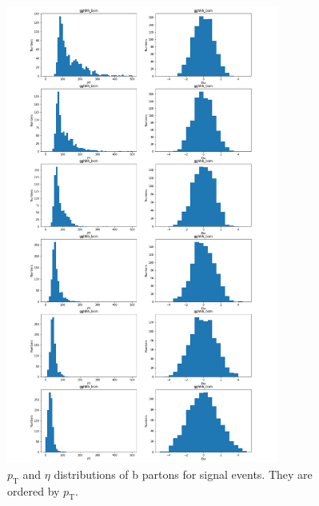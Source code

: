 \documentclass[12pt]{article}
\begin{document}
	\begin{figure}[htpb]
		\centering
		\includegraphics[width=0.8\textwidth]{gghhh_bsm_PT_Eta_order_by_PT.png}
		\caption{$p_\text{T}$ and $\eta$ distributions of b partons for signal events. They are ordered by $p_\text{T}$.}
		\label{fig:signal_pt_eta_distribution_in_parton_level}
	\end{figure}
\end{document}
